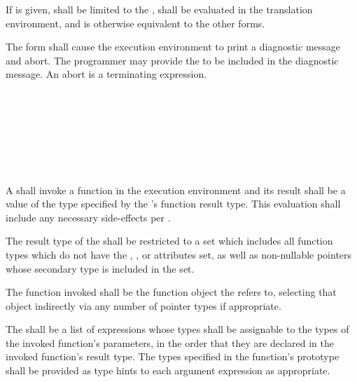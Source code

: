 \specsubsubitem
If  is given,  shall be limited to the
, shall be evaluated in the
translation environment, and is otherwise equivalent to the other forms.

\specsubsubitem
The  form shall cause the execution environment to print a
diagnostic message and abort. The programmer may provide the
 to be included in the diagnostic message. An
abort is a terminating expression.


\begin{grammar}
 \\
	 \terminal{(}  \terminal{)} \\

 \\
	 \optional{\terminal{,}} \\
	  \optional{\terminal{,}} \\
	 \terminal{,}  \\
\end{grammar}

\specsubsubitem
A  shall invoke a function in the execution
environment and its result shall be a value of the type specified by the
's function result type. This evaluation shall
include any necessary side-effects per .

\specsubsubitem
The result type of the  shall be restricted to a
set which includes all function types which do not have the ,
, or  attributes set, as well as non-nullable
pointers whose secondary type is included in the set.


\specsubsubitem
The function invoked shall be the function object the
 refers to, selecting that object indirectly via
any number of pointer types if appropriate.

\specsubsubitem
The  shall be a list of expressions whose types
shall be assignable to the types of the invoked function's parameters, in the
order that they are declared in the invoked function's result type. The types
specified in the function's prototype shall be provided as type hints to each
argument expression as appropriate.

